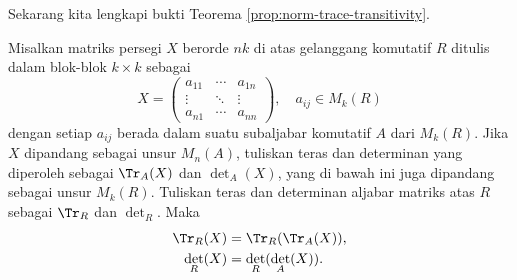 Sekarang kita lengkapi bukti Teorema \ref{prop:norm-trace-transitivity}.
\begin{lemma}\label{prop:det-blocks}
	Misalkan matriks persegi $X$ berorde $nk$ di atas gelanggang komutatif $R$ ditulis dalam blok-blok $k \times k$ sebagai
	\[ X = \begin{pmatrix}
		a_{11} & \cdots & a_{1n} \\
		\vdots & \ddots & \vdots \\
		a_{n1} & \cdots & a_{nn}
	\end{pmatrix}, \quad a_{ij} \in M_k(R) \]
	dengan setiap $a_{ij}$ berada dalam suatu subaljabar komutatif $A$ dari $M_k(R)$. Jika $X$ dipandang sebagai unsur $M_n(A)$, tuliskan teras dan determinan yang diperoleh sebagai $\Tr_A(X)$ dan $\det_A(X)$, yang di bawah ini juga dipandang sebagai unsur $M_k(R)$. Tuliskan teras dan determinan aljabar matriks atas $R$ sebagai $\Tr_R$ dan $\det_R$. Maka
	\begin{align*}
		\Tr_R(X) & = \Tr_R( \Tr_A(X)), \\
		\det_R(X) & = \det_R(\det_A(X)).
	\end{align*}
\end{lemma}
